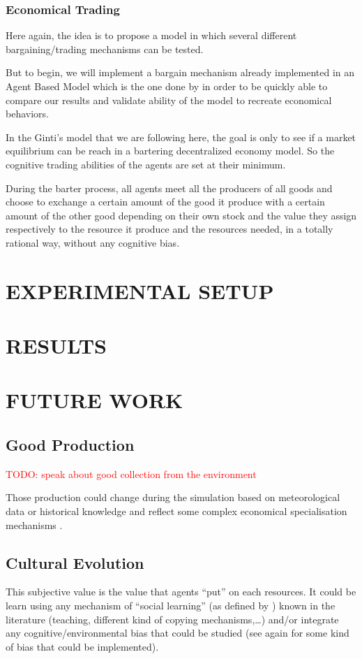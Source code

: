 \documentclass{wscpaperproc}
\newcommand{\memo}[2]{\textcolor{#1}{#2}}
\newcommand{\todo}[1]{\memo{red}{TODO: #1\\}}
\begin{document}
\subsubsection{Economical Trading}\label{trade}
Here again, the idea is to propose a model in which several different bargaining/trading mechanisms can be tested. 

But to begin, we will implement a bargain mechanism already implemented in an Agent Based Model which is the one done by
\cite{gintis_emergence_2006} in order to be quickly able to compare our results and validate ability of the model to recreate economical behaviors. 

In the Ginti's model that we are following here, the goal is only to see if a market equilibrium can be reach in a bartering decentralized economy model. So the cognitive trading abilities of the agents are set at their minimum. 

During the barter process, all agents meet all the producers of all goods and choose to exchange a certain amount of the good it produce with a certain amount of the other good depending on their own stock and the value they assign respectively to the resource it produce and the resources needed, in a totally rational way, without any cognitive bias.

\section{EXPERIMENTAL SETUP}

\section{RESULTS}

\section{FUTURE WORK}
\subsection{Good Production}

\todo{speak about good collection from the environment}

Those production could change during the simulation based on meteorological data or historical knowledge and reflect some complex economical specialisation mechanisms \cite{bentley_specialisation_2005}.


\subsection{Cultural Evolution}
This subjective value is the value that agents ``put'' on each resources. It could be learn using any mechanism of ``social learning'' (as defined by \cite{lycett_cultural_2015}) known in the literature (teaching, different kind of copying mechanisms,\ldots) and/or integrate any cognitive/environmental bias that could be studied (see again \cite{lycett_cultural_2015} for some kind of bias that could be implemented).
\end{document}
